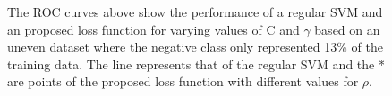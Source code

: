 	\begin{figure}[htp]
	  \begin{center}
	  \end{center}
	  \caption{The ROC curves above show the performance of a regular SVM and an proposed loss function for varying values of C and $\gamma$ based on an uneven dataset where the negative class only represented 13\% of the training data. The line represents that of the regular SVM and the * are points of the proposed loss function with different values for $\rho$.}
	  \label{fig:unevendataset}
	\end{figure}